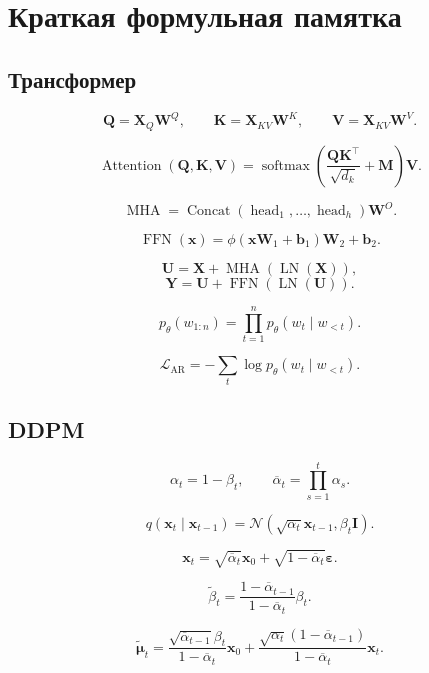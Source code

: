 \documentclass[12pt,a4paper]{article}
\theoremstyle{definition}
\newcommand{\N}{\mathcal{N}}
\newcommand{\softmax}{\operatorname{softmax}}
\newcommand{\eps}{\varepsilon}
\newcommand{\1}{\mathbf{1}}
\begin{document}
\section{Краткая формульная памятка}

\subsection*{Трансформер}

\[
    \bm{Q}=\bm{X}_Q\bm{W}^Q,\qquad
    \bm{K}=\bm{X}_{KV}\bm{W}^K,\qquad
    \bm{V}=\bm{X}_{KV}\bm{W}^V.
\]

\[
    \operatorname{Attention}(\bm{Q},\bm{K},\bm{V})
    =
    \softmax\left(
        \frac{\bm{Q}\bm{K}^{\top}}{\sqrt{d_k}}+\bm{M}
    \right)\bm{V}.
\]

\[
    \operatorname{MHA}
    =
    \operatorname{Concat}
    (\operatorname{head}_1,\ldots,\operatorname{head}_h)\bm{W}^O.
\]

\[
    \operatorname{FFN}(\bm{x})
    =
    \phi(\bm{x}\bm{W}_1+\bm{b}_1)\bm{W}_2+\bm{b}_2.
\]

\[
    \bm{U}
    =
    \bm{X}
    +
    \operatorname{MHA}(\operatorname{LN}(\bm{X})),
\]
\[
    \bm{Y}
    =
    \bm{U}
    +
    \operatorname{FFN}(\operatorname{LN}(\bm{U})).
\]

\[
    p_\theta(w_{1:n})
    =
    \prod_{t=1}^{n}p_\theta(w_t\mid w_{<t}).
\]

\[
    \mathcal{L}_{\text{AR}}
    =
    -\sum_t\log p_\theta(w_t\mid w_{<t}).
\]

\subsection*{DDPM}

\[
    \alpha_t=1-\beta_t,
    \qquad
    \overline{\alpha}_t=\prod_{s=1}^{t}\alpha_s.
\]

\[
    q(\bm{x}_t\mid\bm{x}_{t-1})
    =
    \N(
        \sqrt{\alpha_t}\bm{x}_{t-1},
        \beta_t\bm{I}
    ).
\]

\[
    \bm{x}_t
    =
    \sqrt{\overline{\alpha}_t}\bm{x}_0
    +
    \sqrt{1-\overline{\alpha}_t}\bm{\eps}.
\]

\[
    \widetilde{\beta}_t
    =
    \frac{1-\overline{\alpha}_{t-1}}
         {1-\overline{\alpha}_t}\beta_t.
\]

\[
    \widetilde{\bm{\mu}}_t
    =
    \frac{
        \sqrt{\overline{\alpha}_{t-1}}\beta_t
    }{
        1-\overline{\alpha}_t
    }\bm{x}_0
    +
    \frac{
        \sqrt{\alpha_t}
        (1-\overline{\alpha}_{t-1})
    }{
        1-\overline{\alpha}_t
    }\bm{x}_t.
\]
\end{document}
